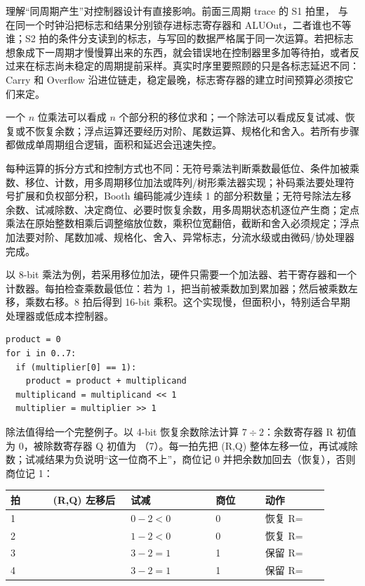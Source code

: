 理解“同周期产生”对控制器设计有直接影响。前面三周期 trace 的 S1 拍里， 与  在同一个时钟沿把标志和结果分别锁存进标志寄存器和 ALUOut，二者谁也不等谁；S2 拍的条件分支读到的标志，与写回的数据严格属于同一次运算。若把标志想象成下一周期才慢慢算出来的东西，就会错误地在控制器里多加等待拍，或者反过来在标志尚未稳定的周期提前采样。真实时序里要照顾的只是各标志延迟不同：Carry 和 Overflow 沿进位链走，稳定最晚，标志寄存器的建立时间预算必须按它们来定。

一个 \(n\) 位乘法可以看成 \(n\) 个部分积的移位求和；一个除法可以看成反复试减、恢复或不恢复余数；浮点运算还要经历对阶、尾数运算、规格化和舍入。若所有步骤都做成单周期组合逻辑，面积和延迟会迅速失控。

每种运算的拆分方式和控制方式也不同：无符号乘法判断乘数最低位、条件加被乘数、移位、计数，用多周期移位加法或阵列/树形乘法器实现；补码乘法要处理符号扩展和负权部分积，Booth 编码能减少连续 1 的部分积数量；无符号除法左移余数、试减除数、决定商位、必要时恢复余数，用多周期状态机逐位产生商；定点乘法在原始整数相乘后调整缩放位数，乘积位宽翻倍，截断和舍入必须规定；浮点加法要对阶、尾数加减、规格化、舍入、异常标志，分流水级或由微码/协处理器完成。

以 8-bit 乘法为例，若采用移位加法，硬件只需要一个加法器、若干寄存器和一个计数器。每拍检查乘数最低位：若为 1，把当前被乘数加到累加器；然后被乘数左移，乘数右移。8 拍后得到 16-bit 乘积。这个实现慢，但面积小，特别适合早期处理器或低成本控制器。

\begin{lstlisting}
product = 0
for i in 0..7:
  if (multiplier[0] == 1):
    product = product + multiplicand
  multiplicand = multiplicand << 1
  multiplier = multiplier >> 1
\end{lstlisting}

除法值得给一个完整例子。以 4-bit 恢复余数除法计算 $7 \div 2$：余数寄存器 R 初值为 0，被除数寄存器 Q 初值为 （7）。每一拍先把 (R,Q) 整体左移一位，再试减除数；试减结果为负说明“这一位商不上”，商位记 0 并把余数加回去（恢复），否则商位记 1：

\begin{longtable}{L{0.12\linewidth}L{0.22\linewidth}L{0.24\linewidth}L{0.14\linewidth}L{0.18\linewidth}}
\toprule
拍 & (R,Q) 左移后 & 试减  & 商位 & 动作 \\
 &  & $0-2<0$ & 0 & 恢复 R= \\
2 &  & $1-2<0$ & 0 & 恢复 R= \\
3 &  & $3-2=1$ & 1 & 保留 R= \\
4 &  & $3-2=1$ & 1 & 保留 R= \\
\bottomrule
\end{longtable}

